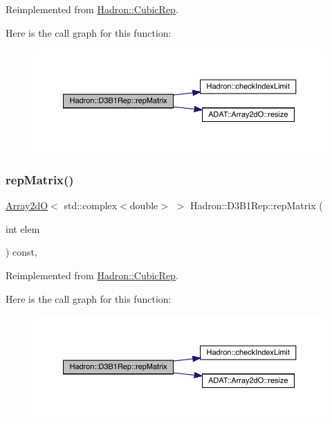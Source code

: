 Reimplemented from \mbox{\hyperlink{structHadron_1_1CubicRep_ac5d7e9e6f4ab1158b5fce3e4ad9e8005}{Hadron\+::\+Cubic\+Rep}}.

Here is the call graph for this function\+:
\nopagebreak
\begin{figure}[H]
\begin{center}
\leavevmode
\includegraphics[width=350pt]{de/dc2/structHadron_1_1D3B1Rep_a2a0563aa28c476f89e8b13f3a95b7cfd_cgraph}
\end{center}
\end{figure}
\mbox{\label{structHadron_1_1D3B1Rep_a2a0563aa28c476f89e8b13f3a95b7cfd}} 
\subsubsection{\texorpdfstring{repMatrix()}{repMatrix()}\hspace{0.1cm}{\footnotesize\ttfamily [3/3]}}
{\footnotesize\ttfamily \mbox{\hyperlink{classADAT_1_1Array2dO}{Array2dO}}$<$ std\+::complex$<$double$>$ $>$ Hadron\+::\+D3\+B1\+Rep\+::rep\+Matrix (\begin{DoxyParamCaption}\item[{int}]{elem }\end{DoxyParamCaption}) const\hspace{0.3cm}{\ttfamily [inline]}, {\ttfamily [virtual]}}



Reimplemented from \mbox{\hyperlink{structHadron_1_1CubicRep_ac5d7e9e6f4ab1158b5fce3e4ad9e8005}{Hadron\+::\+Cubic\+Rep}}.

Here is the call graph for this function\+:
\nopagebreak
\begin{figure}[H]
\begin{center}
\leavevmode
\includegraphics[width=350pt]{de/dc2/structHadron_1_1D3B1Rep_a2a0563aa28c476f89e8b13f3a95b7cfd_cgraph}
\end{center}
\end{figure}



